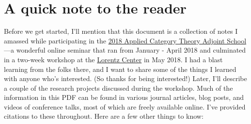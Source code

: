 \documentclass{tufte-handout-tai}
\theoremstyle{plain}
\theoremstyle{definition}
\theoremstyle{remark}
\begin{document}
\section*{A quick note to the reader}
\begin{fullwidth}
Before we get started, I'll mention that this document is a collection of notes I amassed while participating in the \href{http://www.appliedcategorytheory.org/school/}{2018 Applied Category Theory Adjoint School}---a wonderful online seminar that ran from January - April 2018 and culminated in a two-week workshop at the \href{http://www.lorentzcenter.nl/lc/web/2018/969/info.php3?wsid=969&venue=Oort}{Lorentz Center} in May 2018. I had a blast learning from the folks there, and I want to share some of the things I learned with anyone who's interested. (So thanks for being interested!) Later, I'll describe a couple of the research projects discussed during the workshop. Much of the information in this PDF can be found in various journal articles, blog posts, and videos of conference talks, most of which are freely available online. I've provided citations to these throughout. Here are a few other things to know:
\end{fullwidth}
\end{document}
